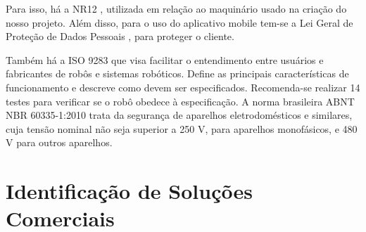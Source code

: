Para isso, há a NR12 \cite{NR12}, utilizada em relação ao maquinário usado na criação do nosso projeto. Além disso, para o uso do aplicativo mobile tem-se a Lei Geral de Proteção de Dados Pessoais \cite{lgpd}, para proteger o cliente.

Também há a ISO 9283 \cite{iso9283} que visa facilitar o entendimento entre usuários e fabricantes de robôs e sistemas robóticos. Define as principais características de funcionamento e descreve como devem ser especificados. Recomenda-se realizar 14 testes para verificar se o robô obedece à especificação. A norma brasileira ABNT NBR 60335-1:2010 trata da segurança de aparelhos eletrodomésticos e similares, cuja tensão nominal não seja superior a 250 V, para aparelhos monofásicos, e 480 V para outros aparelhos.

\section{Identificação de Soluções Comerciais}

